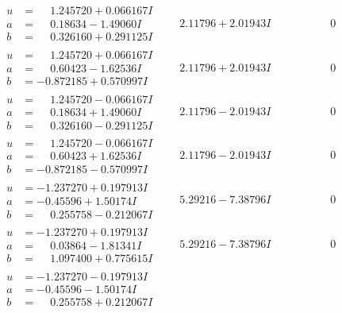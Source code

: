 \documentclass[1p]{elsarticle_modified}
\theoremstyle{definition}
\begin{document}
$$\begin{array}{c|c|c}
\begin{aligned}
u &= \phantom{-}1.245720 + 0.066167 I \\
a &= \phantom{-}0.18634 - 1.49060 I \\
b &= \phantom{-}0.326160 + 0.291125 I\end{aligned}
 & \phantom{-}2.11796 + 2.01943 I & \phantom{-0.000000 } 0 \\ \hline\begin{aligned}
u &= \phantom{-}1.245720 + 0.066167 I \\
a &= \phantom{-}0.60423 - 1.62536 I \\
b &= -0.872185 + 0.570997 I\end{aligned}
 & \phantom{-}2.11796 + 2.01943 I & \phantom{-0.000000 } 0 \\ \hline\begin{aligned}
u &= \phantom{-}1.245720 - 0.066167 I \\
a &= \phantom{-}0.18634 + 1.49060 I \\
b &= \phantom{-}0.326160 - 0.291125 I\end{aligned}
 & \phantom{-}2.11796 - 2.01943 I & \phantom{-0.000000 } 0 \\ \hline\begin{aligned}
u &= \phantom{-}1.245720 - 0.066167 I \\
a &= \phantom{-}0.60423 + 1.62536 I \\
b &= -0.872185 - 0.570997 I\end{aligned}
 & \phantom{-}2.11796 - 2.01943 I & \phantom{-0.000000 } 0 \\ \hline\begin{aligned}
u &= -1.237270 + 0.197913 I \\
a &= -0.45596 + 1.50174 I \\
b &= \phantom{-}0.255758 - 0.212067 I\end{aligned}
 & \phantom{-}5.29216 - 7.38796 I & \phantom{-0.000000 } 0 \\ \hline\begin{aligned}
u &= -1.237270 + 0.197913 I \\
a &= \phantom{-}0.03864 - 1.81341 I \\
b &= \phantom{-}1.097400 + 0.775615 I\end{aligned}
 & \phantom{-}5.29216 - 7.38796 I & \phantom{-0.000000 } 0 \\ \hline\begin{aligned}
u &= -1.237270 - 0.197913 I \\
a &= -0.45596 - 1.50174 I \\
b &= \phantom{-}0.255758 + 0.212067 I\end{aligned}

\end{array}$$
\end{document}
